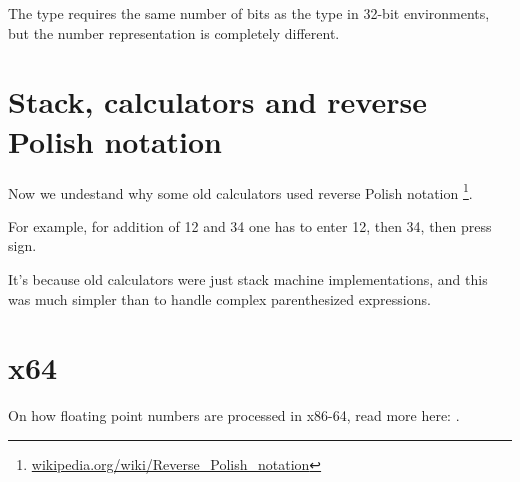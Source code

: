 The \Tfloat type requires the same number of bits as the \Tint type in 32-bit environments, 
but the number representation is completely different.





\section{Stack, calculators and reverse Polish notation}


Now we undestand why some old calculators used reverse Polish notation
\footnote{\href{http://go.yurichev.com/17354}{wikipedia.org/wiki/Reverse\_Polish\_notation}}.

For example, for addition of 12 and 34 one has to enter 12, then 34, then press  sign.

It's because old calculators were just stack machine implementations, and this was much simpler
than to handle complex parenthesized expressions.
\section{x64}

On how floating point numbers are processed in x86-64, read more here: .


